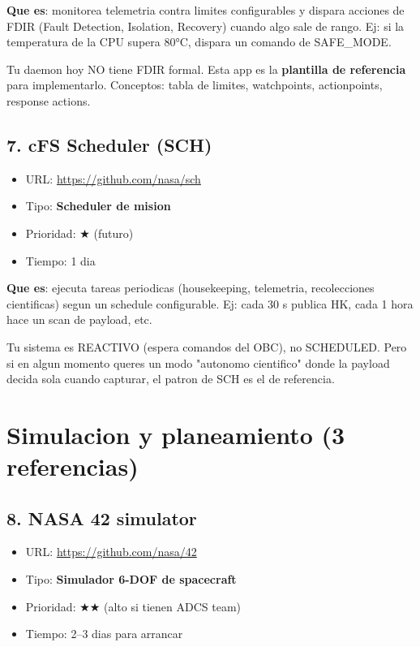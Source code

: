 \documentclass[11pt,a4paper,oneside]{report}
\begin{document}
\textbf{Que es}: monitorea telemetria contra limites configurables y
dispara acciones de FDIR (Fault Detection, Isolation, Recovery) cuando
algo sale de rango. Ej: si la temperatura de la CPU supera 80°C, dispara
un comando de SAFE\_MODE.

\begin{nota}
Tu daemon hoy NO tiene FDIR formal. Esta app es la \textbf{plantilla de
referencia} para implementarlo. Conceptos: tabla de limites, watchpoints,
actionpoints, response actions.
\end{nota}

\section{7. cFS Scheduler (SCH)}

\begin{itemize}[leftmargin=1.5em]
  \item URL: \url{https://github.com/nasa/sch}
  \item Tipo: \textbf{Scheduler de mision}
  \item Prioridad: $\bigstar$ (futuro)
  \item Tiempo: 1 dia
\end{itemize}

\textbf{Que es}: ejecuta tareas periodicas (housekeeping, telemetria,
recolecciones cientificas) segun un schedule configurable. Ej: cada 30 s
publica HK, cada 1 hora hace un scan de payload, etc.

\begin{nota}
Tu sistema es REACTIVO (espera comandos del OBC), no SCHEDULED. Pero si
en algun momento queres un modo "autonomo cientifico" donde la payload
decida sola cuando capturar, el patron de SCH es el de referencia.
\end{nota}

\chapter{Simulacion y planeamiento (3 referencias)}

\section{8. NASA 42 simulator}

\begin{itemize}[leftmargin=1.5em]
  \item URL: \url{https://github.com/nasa/42}
  \item Tipo: \textbf{Simulador 6-DOF de spacecraft}
  \item Prioridad: $\bigstar\bigstar$ (alto si tienen ADCS team)
  \item Tiempo: 2--3 dias para arrancar
\end{itemize}
\end{document}
